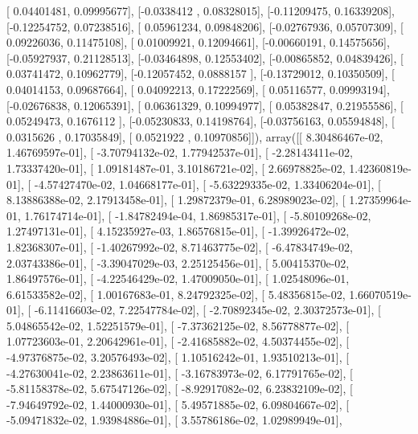 \documentclass{article}
\begin{document}
       [ 0.04401481,  0.09995677],
       [-0.0338412 ,  0.08328015],
       [-0.11209475,  0.16339208],
       [-0.12254752,  0.07238516],
       [ 0.05961234,  0.09848206],
       [-0.02767936,  0.05707309],
       [ 0.09226036,  0.11475108],
       [ 0.01009921,  0.12094661],
       [-0.00660191,  0.14575656],
       [-0.05927937,  0.21128513],
       [-0.03464898,  0.12553402],
       [-0.00865852,  0.04839426],
       [ 0.03741472,  0.10962779],
       [-0.12057452,  0.0888157 ],
       [-0.13729012,  0.10350509],
       [ 0.04014153,  0.09687664],
       [ 0.04092213,  0.17222569],
       [ 0.05116577,  0.09993194],
       [-0.02676838,  0.12065391],
       [ 0.06361329,  0.10994977],
       [ 0.05382847,  0.21955586],
       [ 0.05249473,  0.1676112 ],
       [-0.05230833,  0.14198764],
       [-0.03756163,  0.05594848],
       [ 0.0315626 ,  0.17035849],
       [ 0.0521922 ,  0.10970856]]), array([[  8.30486467e-02,   1.46769597e-01],
       [ -3.70794132e-02,   1.77942537e-01],
       [ -2.28143411e-02,   1.73337420e-01],
       [  1.09181487e-01,   3.10186721e-02],
       [  2.66978825e-02,   1.42360819e-01],
       [ -4.57427470e-02,   1.04668177e-01],
       [ -5.63229335e-02,   1.33406204e-01],
       [  8.13886388e-02,   2.17913458e-01],
       [  1.29872379e-01,   6.28989023e-02],
       [  1.27359964e-01,   1.76174714e-01],
       [ -1.84782494e-04,   1.86985317e-01],
       [ -5.80109268e-02,   1.27497131e-01],
       [  4.15235927e-03,   1.86576815e-01],
       [ -1.39926472e-02,   1.82368307e-01],
       [ -1.40267992e-02,   8.71463775e-02],
       [ -6.47834749e-02,   2.03743386e-01],
       [ -3.39047029e-03,   2.25125456e-01],
       [  5.00415370e-02,   1.86497576e-01],
       [ -4.22546429e-02,   1.47009050e-01],
       [  1.02548096e-01,   6.61533582e-02],
       [  1.00167683e-01,   8.24792325e-02],
       [  5.48356815e-02,   1.66070519e-01],
       [ -6.11416603e-02,   7.22547784e-02],
       [ -2.70892345e-02,   2.30372573e-01],
       [  5.04865542e-02,   1.52251579e-01],
       [ -7.37362125e-02,   8.56778877e-02],
       [  1.07723603e-01,   2.20642961e-01],
       [ -2.41685882e-02,   4.50374455e-02],
       [ -4.97376875e-02,   3.20576493e-02],
       [  1.10516242e-01,   1.93510213e-01],
       [ -4.27630041e-02,   2.23863611e-01],
       [ -3.16783973e-02,   6.17791765e-02],
       [ -5.81158378e-02,   5.67547126e-02],
       [ -8.92917082e-02,   6.23832109e-02],
       [ -7.94649792e-02,   1.44000930e-01],
       [  5.49571885e-02,   6.09804667e-02],
       [ -5.09471832e-02,   1.93984886e-01],
       [  3.55786186e-02,   1.02989949e-01],
\end{document}
